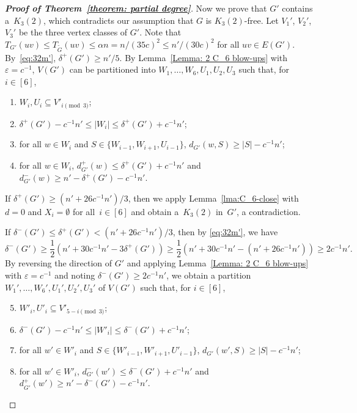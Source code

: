 \documentclass[11pt]{article}
\newcommand{\tG}{\widetilde{G}}
\numberwithin{equation}{section}
\begin{document}
\begin{proof}[\textbf{Proof of Theorem~\ref{theorem: partial degree}}]
        Now we prove that $G'$ contains a~$K_3(2)$, which contradicts our assumption that $G$ is $K_3(2)$-free. Let $V_1'$, $V_2'$, $V_3'$ be the three vertex classes of $G'$. Note that $T_{G'}(uv)\le T_{\tG}(uv)\le \alpha n = n/(35c)^2\le n'/(30c)^2$ for all $uv\in E(G')$.
				By~\eqref{eq:32m'}, $\delta^+(G') \ge n'/5$. 
        By Lemma~\ref{Lemma: 2 C_6 blow-ups} with $\varepsilon = c^{-1}$, $V(G')$ can be partitioned into $W_1,\dots,W_6,U_1,U_2,U_3$ such that, for $i\in [6]$, %
        \begin{enumerate}[label = {\rm (\alph*)}]
          \item $W_i,U_i \subseteq V'_{i\pmod{3}}$;\label{itm:C6:1:1}
          \item $\delta^+(G')-c^{-1}n'\le |W_i|\le \delta^+(G')+c^{-1}n'$;
          \item for all $w\in W_i$ and $S\in \{W_{i-1},W_{i+1},U_{i-1}\}$, $d_{G'}(w,S)\ge |S|-c^{-1}n'$; \label{itm:C6:4:3}
          \item for all $w\in W_i$, $d^+_{G'}(w)\le \delta^+(G')+c^{-1}n'$ and $d^-_{G'}(w)\ge n'-\delta^+(G')-c^{-1}n'$.\label{itm:C6:4:4}
        \end{enumerate}

        If $\delta^+(G')\ge (n'+26c^{-1}n')/{3}$, then we apply Lemma~\ref{lma:C_6-close} with $d=0$ and $X_i=\emptyset$ for all~$i\in [6]$ and obtain a~$K_3(2)$ in~$G'$, a contradiction.

        If $\delta^-(G')\le \delta^+(G')< (n'+26c^{-1}n')/{3}$, then by \eqref{eq:32m'}, we have
        \[
        \delta^-(G')\ge \frac12(n'+30c^{-1}n' - 3\delta^+(G'))  \ge \frac12 (n'+30c^{-1}n' - (n'+26c^{-1}n') )  \ge 2c^{-1}n'.
        \]       
        By reversing the direction of $G'$ and applying Lemma~\ref{Lemma: 2 C_6 blow-ups} with $\varepsilon = c^{-1}$ and noting $ \delta^-(G') \ge 2 c^{-1} n'$, we obtain a partition $W_1',\dots,W_6',U_1',U_2',U_3'$ of $V(G')$ such that, for $i\in [6]$, 
          \begin{enumerate}[label = {\rm (\alph*)}]
          \setcounter{enumi}{4}
          \item $W'_i,U'_i \subseteq V'_{5-i\pmod{3}}$;\label{itm:C6:1:5}
          \item $\delta^-(G')-c^{-1}n'\le |W'_i|\le \delta^-(G')+c^{-1}n'$;
          \item for all $w'\in W'_i$ and $S\in \{W'_{i-1},W'_{i+1},U'_{i-1}\}$, $d_{G'}(w',S)\ge |S|-c^{-1}n'$; \label{itm:C6:4:7}
          \item for all $w'\in W'_i$, $d^-_{G'}(w')\le \delta^-(G')+c^{-1}n'$ and $d^+_{G'}(w')\ge n'-\delta^-(G')-c^{-1}n'$.\label{itm:C6:4:8}
        \end{enumerate}      
        

\end{proof}
\end{document}
